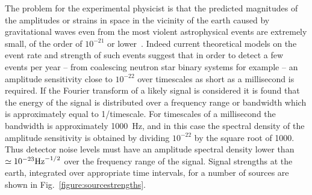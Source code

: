 \documentclass{article}
\begin{document}
The problem for the experimental physicist is that the predicted magnitudes of
the amplitudes or strains in space in the vicinity of the earth caused by
gravitational waves even from the most violent astrophysical events are
extremely small, of the order of $10^{-21}$ or lower~\cite{Sathyaprakash:2009,
LISAsymposium}. Indeed current theoretical models on the event rate and strength
of such events suggest that in order to detect a few events per year -- from
coalescing neutron star binary systems for example -- an amplitude sensitivity
close to $10^{-22}$ over timescales as short as a millisecond is required. If
the Fourier transform of a likely signal is considered it is found that the
energy of the signal is distributed over a frequency range or bandwidth which is
approximately equal to 1/timescale.  For timescales of a millisecond the
bandwidth is approximately 1000~Hz, and in this case the spectral density of the
amplitude sensitivity is obtained by dividing $10^{-22}$ by the square root of
1000. Thus detector noise levels must have an amplitude spectral density lower
than $\simeq 10^{-23}{\rm Hz}^{-1/2}$ over the frequency range of the signal.
Signal strengths at the earth, integrated over appropriate time intervals, for a
number of sources are shown in Fig.~\ref{figure:sourcestrengths}.

\end{document}
